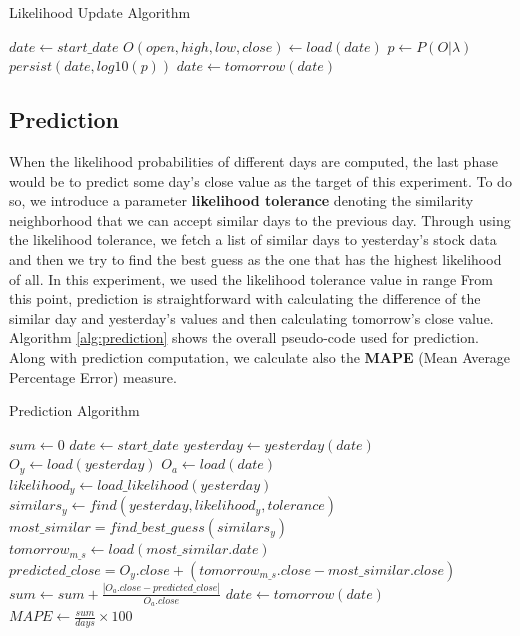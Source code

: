 \documentclass{acm_proc_article-sp}
\begin{document}
\begin{algorithm}[h]
\caption{Likelihood Update Algorithm} \label{alg:likelihood}
\begin{algorithmic}[1]
\STATE $date \gets start\_date$
\STATE $ O(open, high, low, close) \gets load(date) $
\STATE $ p \gets P(O|\lambda) $ 
\STATE $ persist(date, log10(p)) $
\STATE $ date \gets tomorrow(date) $
\ENDFOR
\end{algorithmic}
\end{algorithm}

\subsection{Prediction} \label{sec:pred}
When the likelihood probabilities of different days are computed, the last phase would be to predict some day's close
value as the target of this experiment. To do so, we introduce a parameter \textbf{likelihood tolerance} denoting the
similarity neighborhood that we can accept similar days to the previous day. Through using the likelihood tolerance, we
fetch a list of similar days to yesterday's stock data and then we try to find the best guess as the one that has the
highest likelihood of all. In this experiment, we used the likelihood tolerance value in range \boldmath{[0.001, 0.01]}
From this point, prediction is straightforward with calculating the difference of the similar day and yesterday's
values and then calculating tomorrow's close value. Algorithm \ref{alg:prediction} shows the overall pseudo-code used
for prediction. Along with prediction computation, we calculate also the \textbf{MAPE} (Mean Average Percentage
Error) measure.

\begin{algorithm}[h]
\caption{Prediction Algorithm} \label{alg:prediction}
\begin{algorithmic}[1]
\STATE $ sum \gets 0 $
\STATE $ date \gets start\_date $
\STATE $ yesterday \gets yesterday(date) $
\STATE $ O_y \gets load(yesterday) $
\STATE $ O_a \gets load(date)$
\STATE $ likelihood_y \gets load\_likelihood(yesterday) $
\STATE $ similars_y \gets find(yesterday, likelihood_y, tolerance) $
\STATE $ most\_similar = find\_best\_guess(similars_y) $
\STATE $ tomorrow_{m\_s} \gets load(most\_similar.date) $
\STATE $ predicted\_close = O_y.close + (tomorrow_{m\_s}.close - most\_similar.close) $
\STATE $ sum \gets sum + \frac{|O_a.close - predicted\_close|}{O_a.close} $
\STATE $ date \gets tomorrow(date) $
\ENDFOR
\STATE $ MAPE \gets \frac{sum}{days} \times 100 $
\end{algorithmic}
\end{algorithm}
\end{document}
